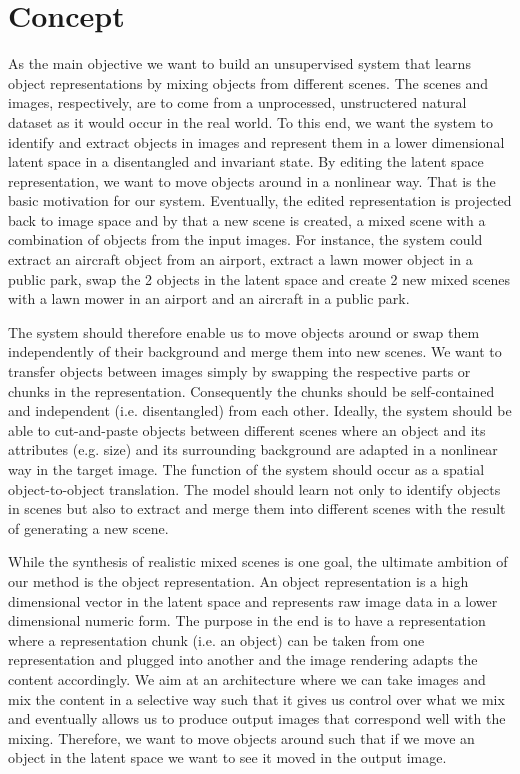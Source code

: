\documentclass[a4paper,12pt]{report}
\begin{document}
\section{Concept}\label{subsec:concept}
As the main objective we want to build an unsupervised system that learns object representations by mixing objects from different scenes. The scenes and images, respectively, are to come from a unprocessed, unstructered natural dataset as it would occur in the real world. To this end, we want the system to identify and extract objects in images and represent them in a lower dimensional latent space in a disentangled and invariant state. By editing the latent space representation, we want to move objects around in a nonlinear way. That is the basic motivation for our system. Eventually, the edited representation is projected back to image space and by that a new scene is created, a mixed scene with a combination of objects from the input images. For instance, the system could extract an aircraft object from an airport, extract a lawn mower object in a public park, swap the 2 objects in the latent space and create 2 new mixed scenes with a lawn mower in an airport and an aircraft in a public park. 

The system should therefore enable us to move objects around or swap them independently of their background and merge them into new scenes. We want to transfer objects between images simply by swapping the respective parts or chunks in the representation. Consequently the chunks should be self-contained and independent (i.e. disentangled) from each other. Ideally, the system should be able to cut-and-paste objects between different scenes where an object and its attributes (e.g. size) and its surrounding background are adapted in a nonlinear way in the target image. The function of the system should occur as a spatial object-to-object translation. The model should learn not only to identify objects in scenes but also to extract and merge them into different scenes with the result of generating a new scene. 

While the synthesis of realistic mixed scenes is one goal, the ultimate ambition of our method is the object representation. An object representation is a high dimensional vector in the latent space and represents raw image data in a lower dimensional numeric form. The purpose in the end is to have a representation where a representation chunk (i.e. an object) can be taken from one representation and plugged into another and the image rendering adapts the content accordingly. We aim at an architecture where we can take images and mix the content in a selective way such that it gives us control over what we mix and eventually allows us to produce output images that correspond well with the mixing. Therefore, we want to move objects around such that if we move an object in the latent space we want to see it moved in the output image. 
\end{document}
